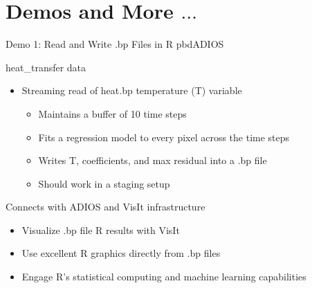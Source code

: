 \section{Demos and More $\ldots$}

\begin{frame}{Demo 1: Read and Write .bp Files in R \hfill pbdADIOS}
  \begin{block}{ \hfill heat\_transfer data}
    \begin{center}
      \begin{itemize}
      \item Streaming read of heat.bp temperature (T) variable
        \begin{itemize}
        \item Maintains a buffer of 10 time steps
        \item Fits a regression model to every pixel across the time steps
        \item Writes T, coefficients, and max residual into a .bp file
        \item Should work in a staging setup
        \end{itemize}
      \end{itemize}
    \end{center}
  \end{block}
  \begin{block}{Connects with ADIOS and VisIt infrastructure}
    \begin{center}
      \begin{itemize}
      \item Visualize .bp file R results with VisIt
      \item Use excellent R graphics directly from .bp files
      \item Engage R's statistical computing and machine learning
        capabilities
      \end{itemize}
    \end{center}
  \end{block}
\end{frame}

